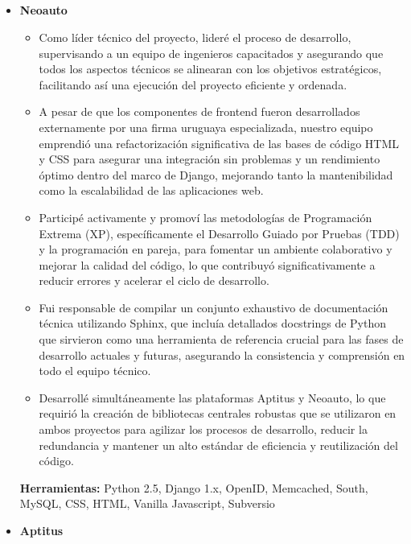 \documentclass[11pt,a4paper,english]{moderncv}
\begin{document}
\subsection{}

{
\begin{itemize}
    \item \textbf{Neoauto}
        \begin{itemize}
            \item Como líder técnico del proyecto, lideré el proceso de desarrollo, supervisando a un equipo de ingenieros capacitados y asegurando que todos los aspectos técnicos se alinearan con los objetivos estratégicos, facilitando así una ejecución del proyecto eficiente y ordenada.
            \item A pesar de que los componentes de frontend fueron desarrollados externamente por una firma uruguaya especializada, nuestro equipo emprendió una refactorización significativa de las bases de código HTML y CSS para asegurar una integración sin problemas y un rendimiento óptimo dentro del marco de Django, mejorando tanto la mantenibilidad como la escalabilidad de las aplicaciones web.
            \item Participé activamente y promoví las metodologías de Programación Extrema (XP), específicamente el Desarrollo Guiado por Pruebas (TDD) y la programación en pareja, para fomentar un ambiente colaborativo y mejorar la calidad del código, lo que contribuyó significativamente a reducir errores y acelerar el ciclo de desarrollo.
            \item Fui responsable de compilar un conjunto exhaustivo de documentación técnica utilizando Sphinx, que incluía detallados docstrings de Python que sirvieron como una herramienta de referencia crucial para las fases de desarrollo actuales y futuras, asegurando la consistencia y comprensión en todo el equipo técnico.
            \item Desarrollé simultáneamente las plataformas Aptitus y Neoauto, lo que requirió la creación de bibliotecas centrales robustas que se utilizaron en ambos proyectos para agilizar los procesos de desarrollo, reducir la redundancia y mantener un alto estándar de eficiencia y reutilización del código.
        \end{itemize}
        \textbf{Herramientas:} Python 2.5, Django 1.x, OpenID, Memcached, South, MySQL, CSS, HTML, Vanilla Javascript, Subversio
    \item \textbf{Aptitus}

\end{itemize}}
\end{document}

